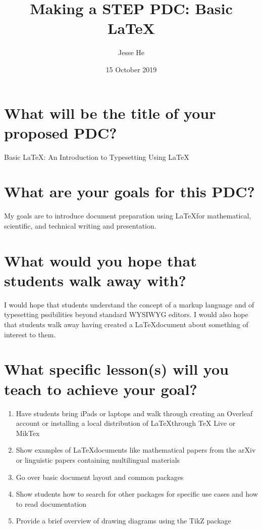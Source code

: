 \documentclass{article}
\title{Making a STEP PDC: Basic \LaTeX}
\author{Jesse He}
\date{15 October 2019}
\begin{document}
\maketitle

\section[title]{What will be the title of your proposed PDC?}
Basic \LaTeX: An Introduction to Typesetting Using \LaTeX

\section[my-goals]{What are your goals for this PDC?}
My goals are to introduce document preparation using \LaTeX for mathematical, scientific, and technical writing and presentation.

\section[student-goals]{What would you hope that students walk away with?}
I would hope that students understand the concept of a markup language and of typesetting pssibilities beyond standard WYSIWYG editors.
I would also hope that students walk away having created a \LaTeX document about something of interest to them.

\section[lessons]{What specific lesson(s) will you teach to achieve your goal?}
\begin{enumerate}
    \item Have students bring iPads or laptops and walk through creating an Overleaf account or installing a local distribution of \LaTeX through TeX Live or MikTex
    \item Show examples of \LaTeX documents like mathematical papers from the arXiv or linguistic papers containing multilingual materials
    \item Go over basic document layout and common packages
    \item Show students how to search for other packages for specific use cases and how to read documentation
    \item Provide a brief overview of drawing diagrams using the TikZ package
\end{enumerate}
\end{document}
